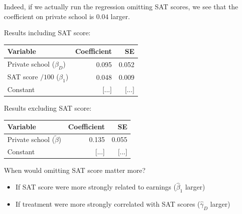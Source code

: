 \documentclass[11pt,english,handout]{beamer}
\newenvironment{wideitemize}{\itemize\addtolength{\itemsep}{10pt}}{\enditemize}
\begin{document}
\begin{frame}
	\begin{wideitemize}
		\item
		Indeed, if we actually run the regression omitting SAT scores, we see that the coefficient on private school is $0.04$ larger.
		
		\item
		Results including SAT score:
		
		\begin{tabular}{lrr}
			Variable & Coefficient & SE \\ \hline
			Private school ($\beta_D$) & 0.095 & 0.052 \\
			SAT score $/ 100$ ($\beta_1$) & 0.048 & 0.009 \\
			Constant & [...] & [...]
		\end{tabular}
		
		
		\item
		Results excluding SAT score:
		\begin{tabular}{lrr}
			Variable & Coefficient & SE \\ \hline
			Private school ($\tilde\beta$) & 0.135 & 0.055 \\
			Constant & [...] & [...]
		\end{tabular}
		
		\pause
		\item
		When would omitting SAT score matter more? \pause
		\begin{itemize}
			\item 
			If SAT score were more strongly related to earnings ($\hat\beta_1$ larger)
			
			\pause
			\item
			If treatment were more strongly correlated with SAT scores ($\hat\gamma_D$ larger)
		\end{itemize}
		
	\end{wideitemize}
\end{frame}
\end{document}
